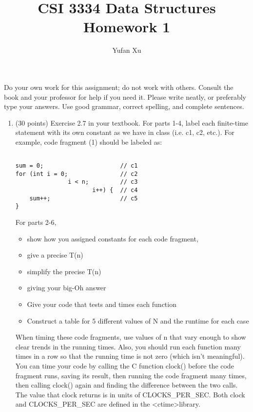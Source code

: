\documentclass[12pt]{article}
\title{CSI 3334 Data Structures\\Homework 1}
\author{Yufan Xu}
\begin{document}
\thispagestyle{empty}

\maketitle 



Do your own work for this assignment; do not work with others. Consult the book
and your professor for help if you need it. Please write neatly, or preferably
type your answers. Use good grammar, correct spelling, and complete sentences.


\begin{enumerate}

\item(30 points) Exercise 2.7 in your textbook. For parts 1-4, label each finite-time statement with its own constant as we have in class (i.e. c1, c2, etc.). For example, code fragment (1) should be labeled as: 

\begin{verbatim}

sum = 0;                      // c1
for (int i = 0;               // c2
               i < n;         // c3
                      i++) {  // c4
    sum++;                    // c5
}

\end{verbatim}

For parts 2-6, 

\begin{itemize}
	\item show how you assigned constants for each code fragment,
	\item give a precise T(n) 
	\item simplify the precise T(n)
	\item giving your big-Oh answer
	\item Give your code that tests and times each function
	\item Construct a table for 5 different values of N and the runtime for each case
\end{itemize} 

When timing these code fragments, use values of n that vary enough to show clear trends in the running times. 
Also, you should run each function many times in a row so that the running time is not zero (which isn't meaningful). 
You can time your code by calling the C function clock() before the code fragment runs, saving its result, then 
running the code fragment many times, then calling clock() again and finding the difference between the two calls. 
The value that clock\( \) returns is in units of CLOCKS\_PER\_SEC. Both clock\( \) and CLOCKS\_PER\_SEC are defined in the \textless ctime\textgreater  library. 



\end{enumerate}
\end{document}
